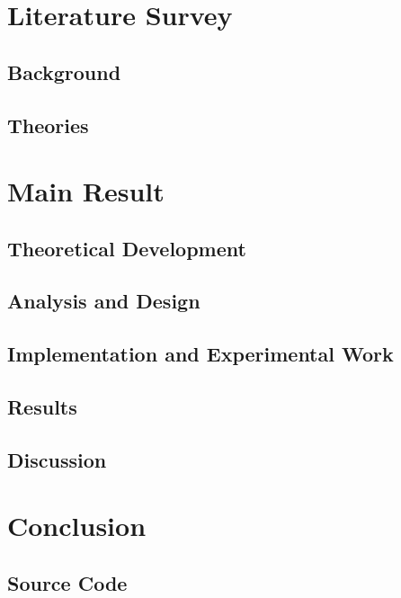 \documentclass[11pt,a4paper]{report}
\begin{document}
	\chapter{Literature Survey}
		\section{Background}
		\section{Theories}
	
	\chapter{Main Result}
		\section{Theoretical Development}
		\section{Analysis and Design}
		\section{Implementation and Experimental Work}
		\section{Results}
		\section{Discussion}
		
	\chapter{Conclusion}
	
	
	
	\nocite{*}
	
	\begin{appendices}
		\chapter{Source Code}
	\end{appendices}
\end{document}
